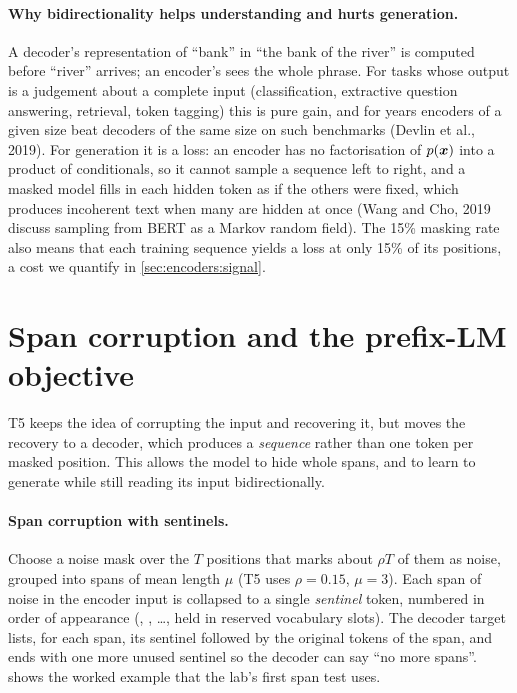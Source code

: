 \paragraph{Why bidirectionality helps understanding and hurts generation.} A decoder's
representation of ``bank'' in ``the bank of the river'' is computed before ``river'' arrives; an
encoder's sees the whole phrase. For tasks whose output is a judgement about a complete input
(classification, extractive question answering, retrieval, token tagging) this is pure gain, and for
years encoders of a given size beat decoders of the same size on such benchmarks (Devlin et al.,
2019). For generation it is a loss: an encoder has no factorisation of $p(\bm{x})$ into a product
of conditionals, so it cannot sample a sequence left to right, and a masked model fills in each hidden
token as if the others were fixed, which produces incoherent text when many are hidden at once
(Wang and Cho, 2019 discuss sampling from BERT as a Markov random field). The 15\% masking rate also
means that each training sequence yields a loss at only 15\% of its positions, a cost we quantify in
\cref{sec:encoders:signal}.

\section{Span corruption and the prefix-LM objective}\label{sec:encoders:span}

T5 keeps the idea of corrupting the input and recovering it, but moves the recovery to a decoder,
which produces a \emph{sequence} rather than one token per masked position. This allows the model to
hide whole spans, and to learn to generate while still reading its input bidirectionally.

\paragraph{Span corruption with sentinels.} Choose a noise mask over the $T$ positions that marks
about $\rho T$ of them as noise, grouped into spans of mean length $\mu$ (T5 uses $\rho=0.15$,
$\mu=3$). Each span of noise in the encoder input is collapsed to a single \emph{sentinel} token,
numbered in order of appearance (, , \ldots{}, held in reserved vocabulary slots).
The decoder target lists, for each span, its sentinel followed by the original tokens of the span,
and ends with one more unused sentinel so the decoder can say ``no more spans''.
 shows the worked example that the lab's first span test uses.

